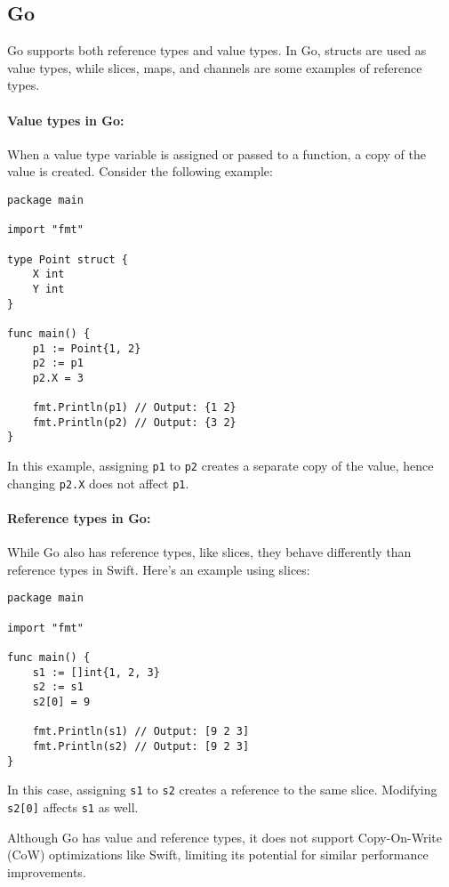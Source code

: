 \subsection{Go}

Go supports both reference types and value types. In Go, structs are used as value types, while slices, maps, and channels are some examples of reference types.

\paragraph{Value types in Go:}
When a value type variable is assigned or passed to a function, a copy of the value is created. Consider the following example:

\begin{verbatim}
package main

import "fmt"

type Point struct {
	X int
	Y int
}

func main() {
	p1 := Point{1, 2}
	p2 := p1
	p2.X = 3

	fmt.Println(p1) // Output: {1 2}
	fmt.Println(p2) // Output: {3 2}
}
\end{verbatim}

In this example, assigning \texttt{p1} to \texttt{p2} creates a separate copy of the value, hence changing \texttt{p2.X} does not affect \texttt{p1}.

\paragraph{Reference types in Go:}
While Go also has reference types, like slices, they behave differently than reference types in Swift. Here's an example using slices:

\begin{verbatim}
package main

import "fmt"

func main() {
	s1 := []int{1, 2, 3}
	s2 := s1
	s2[0] = 9

	fmt.Println(s1) // Output: [9 2 3]
	fmt.Println(s2) // Output: [9 2 3]
}
\end{verbatim}

In this case, assigning \texttt{s1} to \texttt{s2} creates a reference to the same slice. Modifying \texttt{s2[0]} affects \texttt{s1} as well.

Although Go has value and reference types, it does not support Copy-On-Write (CoW) optimizations like Swift, limiting its potential for similar performance improvements.

